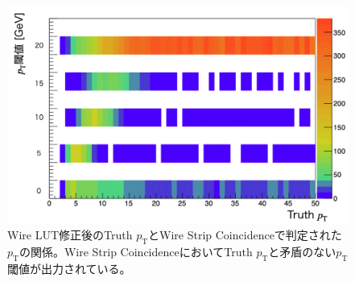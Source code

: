 \begin{figure} 
\centering
\includegraphics[width=16cm]{fig/Test/pt_after.png}
\caption[]{Wire LUT修正後のTruth $p_\mathrm{T}$とWire Strip Coincidenceで判定された$p_\mathrm{T}$の関係。Wire Strip CoincidenceにおいてTruth $p_\mathrm{T}$と矛盾のない$p_\mathrm{T}$ 閾値が出力されている。}
\label{pt_after}
\end{figure}








